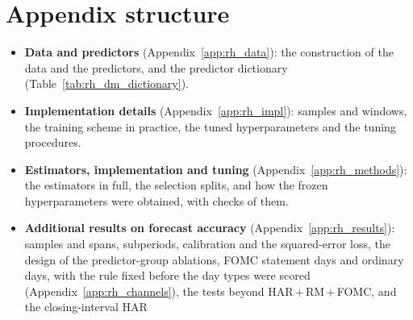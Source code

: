 \section{Appendix structure}
\label{sec:rh_appendix}
\begin{itemize}
\item \textbf{Data and predictors} (Appendix~\ref{app:rh_data}): the construction of the data and the predictors,
  and the predictor dictionary (Table~\ref{tab:rh_dm_dictionary}).
\item \textbf{Implementation details} (Appendix~\ref{app:rh_impl}): samples and windows, the training scheme in
  practice, the tuned hyperparameters and the tuning procedures.
\item \textbf{Estimators, implementation and tuning}
  (Appendix~\ref{app:rh_methods}): the estimators in full, the selection splits, and how the frozen
  hyperparameters were obtained, with checks of them.
\item \textbf{Additional results on forecast accuracy}
  (Appendix~\ref{app:rh_results}): samples and spans, subperiods, calibration and the squared-error loss, the design
  of the predictor-group ablations, FOMC statement days and ordinary days, with the rule fixed before the day types
  were scored (Appendix~\ref{app:rh_channels}), the tests beyond HAR\,+\,RM\,+\,FOMC, and the closing-interval HAR

\end{itemize}
